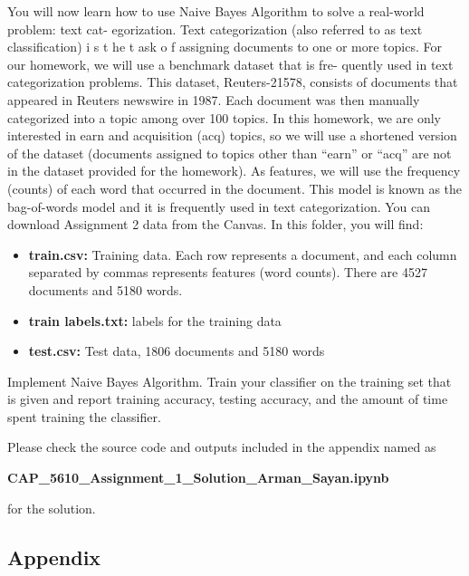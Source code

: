\documentclass[12pt,letterpaper, onecolumn]{exam}
\begin{document}
\begin{questions}
    You will now learn how to use Naive Bayes Algorithm to solve a real-world problem: text cat-
    egorization. Text categorization (also referred to as text classification) i s t he t ask o f assigning
    documents to one or more topics. For our homework, we will use a benchmark dataset that is fre-
    quently used in text categorization problems. This dataset, Reuters-21578, consists of documents that
    appeared in Reuters newswire in 1987. Each document was then manually categorized into a topic
    among over 100 topics. In this homework, we are only interested in earn and acquisition (acq) topics,
    so we will use a shortened version of the dataset (documents assigned to topics other than “earn” or
    “acq” are not in the dataset provided for the homework). As features, we will use the frequency
    (counts) of each word that occurred in the document. This model is known as the bag-of-words model
    and it is frequently used in text categorization. You can download Assignment 2 data from the Canvas.
    In this folder, you will find:

    \begin{itemize}
        \item \textbf{train.csv:} Training data. Each row represents a document, and each column separated by
        commas represents features (word counts). There are 4527 documents and 5180 words.
        \item \textbf{train labels.txt:} labels for the training data
        \item \textbf{test.csv:} Test data, 1806 documents and 5180 words
    \end{itemize}

    Implement Naive Bayes Algorithm. Train your classifier on the training set that is given and report training accuracy, testing accuracy, and the amount of time spent training the classifier.

    \begin{solution}

        Please check the source code and outputs included in the appendix named as
    
        \begin{center}
            \textbf{CAP\_5610\_Assignment\_1\_Solution\_Arman\_Sayan.ipynb}
        \end{center}
            
        for the solution.
    \end{solution}

    \pagebreak
    
\end{questions}

\begin{appendix}
    \centering
    \begin{flushleft}  
      \section{Appendix}
      
    \end{flushleft}
\end{appendix}
\end{document}
